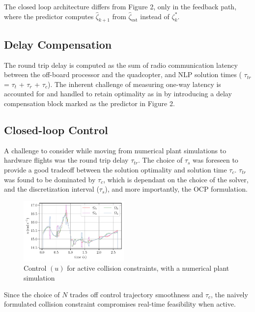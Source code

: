 \documentclass[conference]{IEEEtran}
\begin{document}
The closed loop architecture differs from Figure 2, only in the feedback path, where the predictor computes $\hat{\zeta}_{k+1}$ from $\hat{\zeta}_{\mathrm{est}}$ instead of $\zeta^*_{k}$.

\subsection{Delay Compensation}

The round trip delay is computed as the sum of radio communication latency between the off-board processor and the quadcopter, and NLP solution times ( $\tau_{tr}$ = $\tau_{t}$ + $\tau_{r}$ + $\tau_{c}$). The inherent challenge of measuring one-way latency is accounted for and handled to retain optimality as in \cite{carlos_efficient_2020} by introducing a delay compensation block marked as the predictor in Figure 2.

\subsection{Closed-loop Control}\label{Section5}

A challenge to consider while moving from numerical plant simulations to hardware flights was the round trip delay $\tau_{tr}$. The choice of
$\tau_s$ was foreseen to provide a good tradeoff between the solution optimality and solution time $\tau_{c}$.
$\tau_{tr}$ was found to be dominated by $\tau_{c}$, which is dependant on the choice of the solver, and the discretization interval ($\tau_s$), and more importantly, the OCP formulation.

\begin{figure}[t!]
    \includegraphics[width=0.48\textwidth]{figures/u.pdf}
    \caption{Control $(u)$ for active collision constraints, with a numerical plant simulation}  \label{fig_comp_zeta_u_AGV}
\end{figure}

Since the choice of $N$ trades off control trajectory smoothness and $\tau_{c}$, the naively formulated collision constraint compromises real-time feasibility when active.
\end{document}
